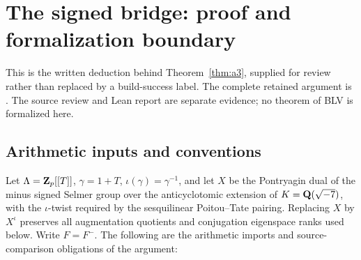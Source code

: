 \section{The signed bridge: proof and formalization boundary}\label{app:a3proof}

This is the written deduction behind Theorem~\ref{thm:a3}, supplied for review rather than replaced by a build-success label. The complete retained argument is
.
The source review and Lean report are separate evidence; no theorem of BLV is formalized here.

\subsection{Arithmetic inputs and conventions}
Let $\Lambda=\mathbf{Z}_p[[T]]$, $\gamma=1+T$, $\iota(\gamma)=\gamma^{-1}$, and let $X$ be the Pontryagin dual of the minus signed Selmer group over the anticyclotomic extension of $K=\mathbf{Q}(\sqrt{-7})$, with the $\iota$-twist required by the sesquilinear Poitou--Tate pairing. Replacing $X$ by $X^\iota$ preserves all augmentation quotients and conjugation eigenspace ranks used below. Write $F=F^-$.
The following are the arithmetic imports and source-comparison obligations of the argument:
